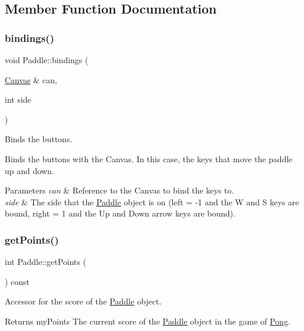 \subsection{Member Function Documentation}
\mbox{\label{class_paddle_ab90901e8e4a4cbf0c99c537583b6ee30}} 
\subsubsection{\texorpdfstring{bindings()}{bindings()}}
{\footnotesize\ttfamily void Paddle\+::bindings (\begin{DoxyParamCaption}\item[{\hyperlink{classtsgl_1_1_canvas}{Canvas} \&}]{can,  }\item[{int}]{side }\end{DoxyParamCaption})}



Binds the buttons. 

Binds the buttons with the Canvas. In this case, the keys that move the paddle up and down. 
\begin{DoxyParams}{Parameters}
{\em can} & Reference to the Canvas to bind the keys to. \\
\hline
{\em side} & The side that the \hyperlink{class_paddle}{Paddle} object is on (left = -\/1 and the W and S keys are bound, right = 1 and the Up and Down arrow keys are bound). \\
\hline
\end{DoxyParams}
\mbox{\label{class_paddle_a4425cbb3e6160de003c7fd364a9ad14b}} 
\subsubsection{\texorpdfstring{get\+Points()}{getPoints()}}
{\footnotesize\ttfamily int Paddle\+::get\+Points (\begin{DoxyParamCaption}{ }\end{DoxyParamCaption}) const}



Accessor for the score of the \hyperlink{class_paddle}{Paddle} object. 

\begin{DoxyReturn}{Returns}
my\+Points The current score of the \hyperlink{class_paddle}{Paddle} object in the game of \hyperlink{class_pong}{Pong}. 
\end{DoxyReturn}
\mbox{\label{class_paddle_ab27981223156aa4a2b03203733514a6d}} 
